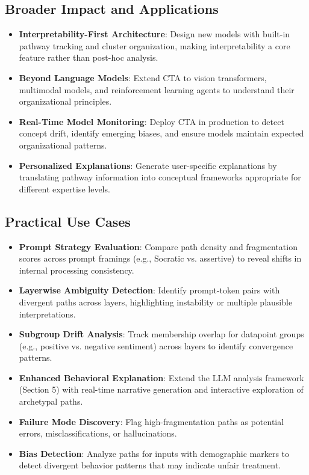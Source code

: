 \subsection{Broader Impact and Applications}

\begin{itemize}
    \item \textbf{Interpretability-First Architecture}: Design new models with built-in pathway tracking and cluster organization, making interpretability a core feature rather than post-hoc analysis.
    
    \item \textbf{Beyond Language Models}: Extend CTA to vision transformers, multimodal models, and reinforcement learning agents to understand their organizational principles.
    
    \item \textbf{Real-Time Model Monitoring}: Deploy CTA in production to detect concept drift, identify emerging biases, and ensure models maintain expected organizational patterns.
    
    \item \textbf{Personalized Explanations}: Generate user-specific explanations by translating pathway information into conceptual frameworks appropriate for different expertise levels.
\end{itemize}

\subsection{Practical Use Cases}

\begin{itemize}
    \item \textbf{Prompt Strategy Evaluation}: Compare path density and fragmentation scores across prompt framings (e.g., Socratic vs. assertive) to reveal shifts in internal processing consistency.
    
    \item \textbf{Layerwise Ambiguity Detection}: Identify prompt-token pairs with divergent paths across layers, highlighting instability or multiple plausible interpretations.
    
    \item \textbf{Subgroup Drift Analysis}: Track membership overlap for datapoint groups (e.g., positive vs. negative sentiment) across layers to identify convergence patterns.
    
    \item \textbf{Enhanced Behavioral Explanation}: Extend the LLM analysis framework (Section 5) with real-time narrative generation and interactive exploration of archetypal paths.
    
    \item \textbf{Failure Mode Discovery}: Flag high-fragmentation paths as potential errors, misclassifications, or hallucinations.
    
    \item \textbf{Bias Detection}: Analyze paths for inputs with demographic markers to detect divergent behavior patterns that may indicate unfair treatment.
\end{itemize}


